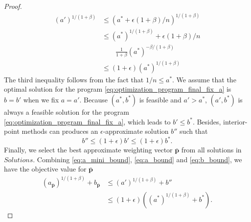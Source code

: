 \documentclass[letterpaper]{article} %
\newcommand{\probdistri}{\mathbf{p}}
\newcommand{\complexbound}{\beta}
\newcommand{\red}[1]{\textcolor{red}{#1}}
\newcommand{\todo}[1]{\red{\textsc{todo:} #1}}
\begin{document}
\begin{proof}
  \begin{equation}
  \label{eq:a_bound}
  \begin{aligned}
    (a')^{1/(1+\complexbound{})}&\le (a^*+\epsilon(1+\beta)/n)^{1/(1+\complexbound{})}\\
    &\le (a^*)^{1/(1+\complexbound{})} + \epsilon(1+\beta)/n\\
    &\qquad\frac{1}{1+\complexbound{}}(a^*)^{-\complexbound{}/(1+\complexbound{})}\\
    &\le (1+\epsilon)(a^*)^{1/(1+\complexbound{})}
  \end{aligned}
  \end{equation}
  The third inequality follows from the fact that $1/n\le a^*$.
  We assume that the optimal solution for the program \eqref{eq:optimization_program_final_fix_a} is $b=b'$ when we fix $a=a'$.
  Because $(a^*,b^*)$ is feasible and $a'>a^*$, $(a', b^*)$ is always a feasible solution for the program \eqref{eq:optimization_program_final_fix_a}, which leads to $b'\le b^*$.
  Besides, interior-point methods can produces an $\epsilon$-approximate solution $b''$ such that
  \begin{equation}
    \label{eq:b_bound}
    b''\le (1+\epsilon)b'\le (1+\epsilon)b^*.
  \end{equation}
  Finally, we select the best approximate weighting vector $\bar{\probdistri{}}$ from all solutions in $Solutions$. 
  Combining \eqref{eq:a_mini_bound}, \eqref{eq:a_bound} and \eqref{eq:b_bound}, we have the objective value for $\bar{\probdistri{}}$
  \begin{align*}
    (a_{\bar{\probdistri{}}})^{1/(1+\complexbound{})} + b_{\bar{\probdistri{}}} & \le (a')^{1/(1+\complexbound{})} + b''\\
    &\le (1+\epsilon)((a^*)^{1/(1+\complexbound{})} + b^*).
  \end{align*}
\end{proof}


\end{document}
